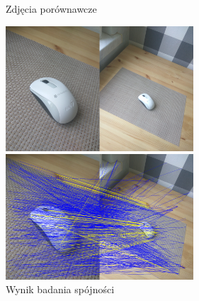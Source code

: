 \documentclass[../main.tex]{subfiles}
\begin{document}
    \begin{figure}[H]
    \centering
    \begin{minipage}{.5\textwidth}
        \caption{Zdjęcia porównawcze}
        \centering
        \includegraphics[width=7cm]{mouse_kitchen_clean_out}
    \end{minipage}%
    \begin{minipage}{.5\textwidth}
        \caption{Wynik badania spójności}
        \centering
        \includegraphics[width=7cm]{mouse_kitchen_pairs_conspairs_out}
    \end{minipage}%
    \end{figure}
\end{document}
